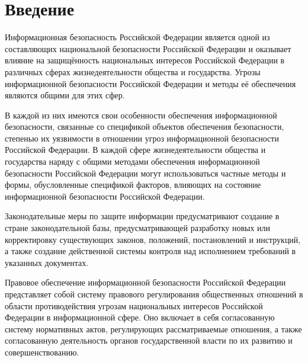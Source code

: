 \section{Введение} \label{rights_introduction}

Информационная безопасность Российской Федерации является одной из составляющих национальной безопасности Российской Федерации и оказывает влияние на защищённость национальных интересов Российской Федерации в различных сферах жизнедеятельности общества и государства. Угрозы информационной безопасности Российской Федерации и методы её обеспечения являются общими для этих сфер.

\vspace{\baselineskip}
В каждой из них имеются свои особенности обеспечения информационной безопасности, связанные со спецификой объектов обеспечения безопасности, степенью их уязвимости в отношении угроз информационной безопасности Российской Федерации. В каждой сфере жизнедеятельности общества и государства наряду с общими методами обеспечения информационной безопасности Российской Федерации могут использоваться частные методы и формы, обусловленные спецификой факторов, влияющих на состояние информационной безопасности Российской Федерации.

\vspace{\baselineskip}
Законодательные меры по защите информации предусматривают создание в стране законодательной базы, предусматривающей разработку новых или корректировку существующих законов, положений, постановлений и инструкций, а также создание действенной системы контроля над исполнением требований в указанных документах.

\vspace{\baselineskip}
Правовое обеспечение информационной безопасности Российской Федерации представляет собой систему правового регулирования общественных отношений в области противодействия угрозам национальных интересов Российской Федерации в информационной сфере. 	Оно включает в себя согласованную систему нормативных актов, регулирующих рассматриваемые отношения, а также согласованную деятельность органов государственной власти по их развитию и совершенствованию.